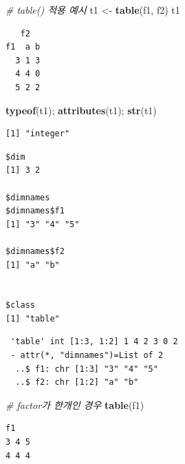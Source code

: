 \documentclass[
  11pt,
]{krantz}
\newenvironment{Shaded}{\begin{snugshade}}{\end{snugshade}}
\newcommand{\CommentTok}[1]{\textcolor[rgb]{0.37,0.37,0.37}{\textit{#1}}}
\newcommand{\KeywordTok}[1]{\textcolor[rgb]{0.27,0.27,0.27}{\textbf{#1}}}
\newcommand{\NormalTok}[1]{#1}
\newcommand{\StringTok}[1]{\textcolor[rgb]{0.5,0.5,0.5}{#1}}
\begin{document}
\footnotesize

\begin{Shaded}
\begin{Highlighting}[]
\CommentTok{# table() 적용 예시}
\NormalTok{t1 <-}\StringTok{ }\KeywordTok{table}\NormalTok{(f1, f2)}
\NormalTok{t1}
\end{Highlighting}
\end{Shaded}

\begin{verbatim}
   f2
f1  a b
  3 1 3
  4 4 0
  5 2 2
\end{verbatim}

\begin{Shaded}
\begin{Highlighting}[]
\KeywordTok{typeof}\NormalTok{(t1); }\KeywordTok{attributes}\NormalTok{(t1); }\KeywordTok{str}\NormalTok{(t1)}
\end{Highlighting}
\end{Shaded}

\begin{verbatim}
[1] "integer"
\end{verbatim}

\begin{verbatim}
$dim
[1] 3 2

$dimnames
$dimnames$f1
[1] "3" "4" "5"

$dimnames$f2
[1] "a" "b"


$class
[1] "table"
\end{verbatim}

\begin{verbatim}
 'table' int [1:3, 1:2] 1 4 2 3 0 2
 - attr(*, "dimnames")=List of 2
  ..$ f1: chr [1:3] "3" "4" "5"
  ..$ f2: chr [1:2] "a" "b"
\end{verbatim}

\begin{Shaded}
\begin{Highlighting}[]
\CommentTok{# factor가 한개인 경우}
\KeywordTok{table}\NormalTok{(f1)}
\end{Highlighting}
\end{Shaded}

\begin{verbatim}
f1
3 4 5 
4 4 4 
\end{verbatim}
\end{document}
